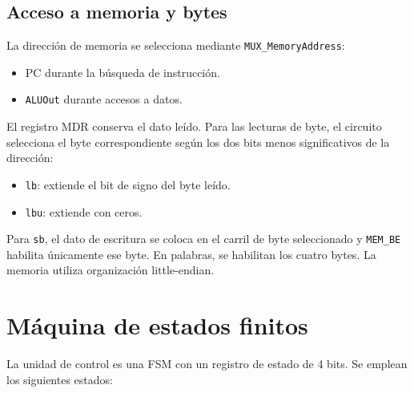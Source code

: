 \documentclass[11pt,a4paper]{article}
\begin{document}
\subsection{Acceso a memoria y bytes}

La dirección de memoria se selecciona mediante \texttt{MUX\_MemoryAddress}:
\begin{itemize}
  \item PC durante la búsqueda de instrucción.
  \item \texttt{ALUOut} durante accesos a datos.
\end{itemize}
El registro MDR conserva el dato leído. Para las lecturas de byte, el circuito selecciona el byte correspondiente según los dos bits menos significativos de la dirección:
\begin{itemize}
  \item \texttt{lb}: extiende el bit de signo del byte leído.
  \item \texttt{lbu}: extiende con ceros.
\end{itemize}
Para \texttt{sb}, el dato de escritura se coloca en el carril de byte seleccionado y \texttt{MEM\_BE} habilita únicamente ese byte. En palabras, se habilitan los cuatro bytes. La memoria utiliza organización little-endian.

\section{Máquina de estados finitos}

La unidad de control es una FSM con un registro de estado de 4 bits. Se emplean los siguientes estados:
\end{document}
